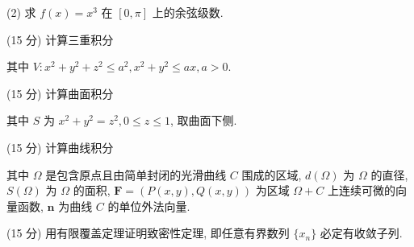 (2) 求 $f(x) = x^3$ 在 $[0, \pi]$ 上的余弦级数.\par
\par{}
\par{}
(15 分) 计算三重积分\par
\nopagebreak[4]
其中 $V: x^{2} + y^{2} + z^{2} \leq a^{2}, x^{2} + y^{2} \leq ax, a > 0.$\par
\par{}
\par{}
(15 分) 计算曲面积分\par
\nopagebreak[4]
其中 $S$ 为 $x^{2} + y^{2} = z^{2}, 0 \leq z \leq 1$, 取曲面下侧.\par
\par{}
\par{}
(15 分) 计算曲线积分\par
\nopagebreak[4]
其中 $\Omega$ 是包含原点且由简单封闭的光滑曲线 $C$ 围成的区域, $d(\Omega)$ 为 $\Omega$ 的直径, $S(\Omega)$ 为 $\Omega$ 的面积, $\pmb{F} = (P(x,y), Q(x,y))$ 为区域 $\Omega + C$ 上连续可微的向量函数, $\pmb{n}$ 为曲线 $C$ 的单位外法向量.\par
\par{}
(15 分) 用有限覆盖定理证明致密性定理, 即任意有界数列 $\{x_{n}\}$ 必定有收敛子列.\par
